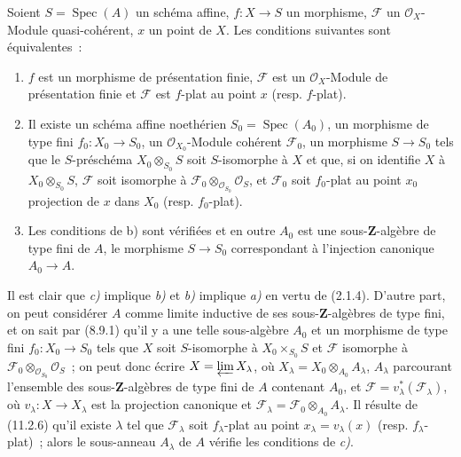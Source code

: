 \begin{corollary}[11.2.7]
\label{IV.11.2.7-fr}
Soient $S=\operatorname{Spec}(A)$ un schéma affine, $f:X\to S$ un morphisme,
$\mathcal F$ un $\mathcal O_X$-Module quasi-cohérent, $x$ un point de $X$.
Les conditions suivantes sont équivalentes~:
\begin{enumerate}[label=\emph{\alph*)}]
\item $f$ est un morphisme de présentation finie, $\mathcal F$ est un
$\mathcal O_X$-Module de présentation finie et $\mathcal F$ est $f$-plat au
point $x$ (\textup{resp.} $f$-plat).


\item Il existe un schéma affine \textup{noethérien} $S_0=\operatorname{Spec}(A_0)$,
un morphisme de type fini $f_0:X_0\to S_0$, un
$\mathcal O_{X_0}$-Module cohérent $\mathcal F_0$, un morphisme $S\to S_0$
tels que le $S$-préschéma $X_0\otimes_{S_0}S$ soit $S$-isomorphe à $X$ et
que, si on identifie $X$ à $X_0\otimes_{S_0}S$, $\mathcal F$ soit isomorphe
à $\mathcal F_0\otimes_{\mathcal O_{S_0}}\mathcal O_S$, et $\mathcal F_0$
soit $f_0$-plat au point $x_0$ projection de $x$ dans $X_0$ (\textup{resp.}
$f_0$-plat).
\item Les conditions de \textup{b)} sont vérifiées et en outre $A_0$ est une
sous-$\mathbf Z$-algèbre de type fini de $A$, le morphisme $S\to S_0$
correspondant à l'injection canonique $A_0\to A$.
\end{enumerate}
\end{corollary}

Il est clair que \emph{c)} implique \emph{b)} et \emph{b)} implique \emph{a)} en vertu de (2.1.4).
D'autre part, on peut considérer $A$ comme limite inductive de ses
sous-$\mathbf Z$-algèbres de type fini, et on sait par (8.9.1) qu'il y a une
telle sous-algèbre $A_0$ et un morphisme de type fini $f_0:X_0\to S_0$ tels
que $X$ soit $S$-isomorphe à $X_0\times_{S_0}S$ et $\mathcal F$ isomorphe à
$\mathcal F_0\otimes_{\mathcal O_{S_0}}\mathcal O_S$~; on peut donc écrire
$X=\varprojlim X_\lambda$, où $X_\lambda=X_0\otimes_{A_0}A_\lambda$,
$A_\lambda$ parcourant l'ensemble des sous-$\mathbf Z$-algèbres de type
fini de $A$ contenant $A_0$, et $\mathcal F=v_\lambda^*(\mathcal F_\lambda)$,
où $v_\lambda:X\to X_\lambda$ est la projection canonique et
$\mathcal F_\lambda=\mathcal F_0\otimes_{A_0}A_\lambda$. Il résulte de
(11.2.6) qu'il existe $\lambda$ tel que $\mathcal F_\lambda$ soit
$f_\lambda$-plat au point $x_\lambda=v_\lambda(x)$ (resp.
$f_\lambda$-plat)~; alors le sous-anneau $A_\lambda$ de $A$ vérifie les
conditions de \emph{c)}.

